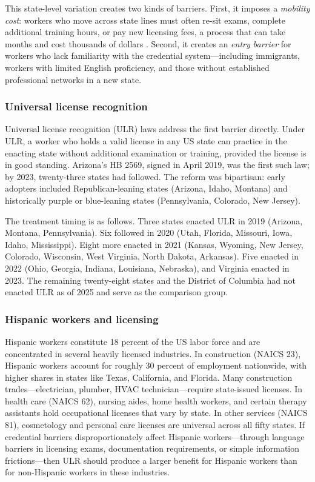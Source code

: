 \documentclass[12pt]{article}
\begin{document}
This state-level variation creates two kinds of barriers. First, it imposes a \textit{mobility cost}: workers who move across state lines must often re-sit exams, complete additional training hours, or pay new licensing fees, a process that can take months and cost thousands of dollars \citep{johnson2020licensing}. Second, it creates an \textit{entry barrier} for workers who lack familiarity with the credential system---including immigrants, workers with limited English proficiency, and those without established professional networks in a new state.

\subsubsection*{Universal license recognition} Universal license recognition (ULR) laws address the first barrier directly. Under ULR, a worker who holds a valid license in any US state can practice in the enacting state without additional examination or training, provided the license is in good standing. Arizona's HB 2569, signed in April 2019, was the first such law; by 2023, twenty-three states had followed. The reform was bipartisan: early adopters included Republican-leaning states (Arizona, Idaho, Montana) and historically purple or blue-leaning states (Pennsylvania, Colorado, New Jersey).

The treatment timing is as follows. Three states enacted ULR in 2019 (Arizona, Montana, Pennsylvania). Six followed in 2020 (Utah, Florida, Missouri, Iowa, Idaho, Mississippi). Eight more enacted in 2021 (Kansas, Wyoming, New Jersey, Colorado, Wisconsin, West Virginia, North Dakota, Arkansas). Five enacted in 2022 (Ohio, Georgia, Indiana, Louisiana, Nebraska), and Virginia enacted in 2023. The remaining twenty-eight states and the District of Columbia had not enacted ULR as of 2025 and serve as the comparison group.

\subsubsection*{Hispanic workers and licensing} Hispanic workers constitute 18 percent of the US labor force and are concentrated in several heavily licensed industries. In construction (NAICS 23), Hispanic workers account for roughly 30 percent of employment nationwide, with higher shares in states like Texas, California, and Florida. Many construction trades---electrician, plumber, HVAC technician---require state-issued licenses. In health care (NAICS 62), nursing aides, home health workers, and certain therapy assistants hold occupational licenses that vary by state. In other services (NAICS 81), cosmetology and personal care licenses are universal across all fifty states. If credential barriers disproportionately affect Hispanic workers---through language barriers in licensing exams, documentation requirements, or simple information frictions---then ULR should produce a larger benefit for Hispanic workers than for non-Hispanic workers in these industries.
\end{document}
